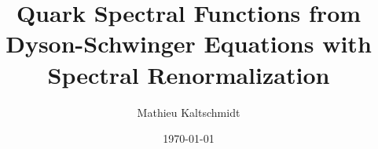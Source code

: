 \title{Quark Spectral Functions from Dyson-Schwinger Equations with Spectral Renormalization}
\author{Mathieu Kaltschmidt}
\date{\today}



\newtheorem{statements}{Statements}[chapter]

\newcommand{\statement}[1]{\stepcounter{statements}\begin{center}
	\textbf{#1}
	\end{center}
}


\usepackage{epigraph}
\setlength{\epigraphwidth}{.8\textwidth}
\setlength{\epigraphrule}{0pt}


\newcommand{\Z}{\mathcal{Z}[J]}
\renewcommand{\S}{\mathcal{S}[\varphi]}
\newcommand{\D}{\mathcal{D}}
\newcommand{\W}{\mathcal{W}[J]}
\newcommand{\cf}[1]{\langle #1 \rangle}